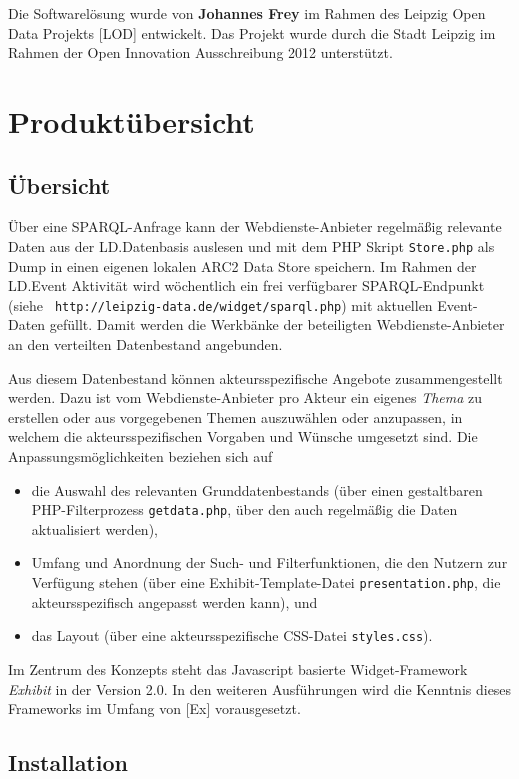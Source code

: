 \documentclass[11pt,a4paper]{article}
\begin{document}
Die Softwarelösung wurde von \textbf{Johannes Frey} im Rahmen des Leipzig Open
Data Projekts [LOD] entwickelt. Das Projekt wurde durch die Stadt Leipzig im
Rahmen der Open Innovation Ausschreibung 2012 unterstützt.

\section{Produktübersicht}

\subsection{Übersicht}

Über eine SPARQL-Anfrage kann der
Webdienste-Anbieter regelmäßig relevante Daten aus der LD.Datenbasis auslesen
und mit dem PHP Skript \texttt{Store.php} als Dump in einen eigenen lokalen
ARC2 Data Store speichern. Im Rahmen der LD.Event Aktivität wird wöchentlich
ein frei verfügbarer SPARQL-Endpunkt (siehe \texttt{ http://leipzig-data.de/widget/sparql.php}) mit aktuellen Event-Daten gefüllt. Damit
werden die {\glqq}Werkbänke{\grqq} der beteiligten Webdienste-Anbieter an den
verteilten Datenbestand angebunden.

Aus diesem Datenbestand können akteursspezifische Angebote zusammengestellt
werden.  Dazu ist vom Webdienste-Anbieter pro Akteur ein eigenes \emph{Thema}
zu erstellen oder aus vorgegebenen Themen auszuwählen oder anzupassen, in
welchem die akteursspezifischen Vorgaben und Wünsche umgesetzt sind.  Die
Anpassungsmöglichkeiten beziehen sich auf
\begin{itemize}
\item die Auswahl des relevanten Grunddatenbestands (über einen gestaltbaren
  PHP-Filter\-prozess \texttt{getdata.php}, über den auch regelmäßig die Daten
  aktualisiert werden),
\item Umfang und Anordnung der Such- und Filterfunktionen, die den Nutzern zur
  Verfügung stehen (über eine Exhibit-Template-Datei
  \texttt{presentation.php}, die akteursspezifisch angepasst werden kann), und
\item das Layout (über eine akteursspezifische CSS-Datei \texttt{styles.css}). 
\end{itemize}
Im Zentrum des Konzepts steht das Javascript basierte Widget-Framework
\emph{Exhibit} in der Version 2.0. In den weiteren Ausführungen wird die
Kenntnis dieses Frameworks im Umfang von [Ex] vorausgesetzt.

\subsection{Installation}
\end{document}
